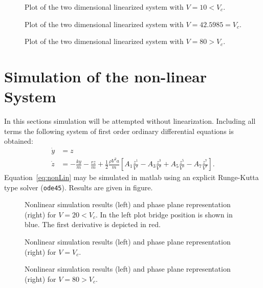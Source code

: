 \begin{figure}
\centering

\caption{Plot of the two dimensional linearized system with $V = 10 < V_c$.}

\caption{Plot of the two dimensional linearized system with $V = 42.5985 = V_c$.}

\caption{Plot of the two dimensional linearized system with $V = 80 > V_c$.}
\end{figure}




\section{Simulation of the non-linear System}
In this sections simulation will be attempted without linearization. Including all terms the following system of first order ordinary differential equations is obtained:
\begin{align}
\dot{y} &= z \\
\dot{z} &= -\frac{ky}{m} - \frac{rz}{m} + \frac{1}{2} \frac{\rho V^2 a}{m} [ A_1\frac{z^1}{V^1} - A_3 \frac{z^3}{V^3} + A_5 \frac{z^5}{V^5} - A_7 \frac{z^7}{V^7} ].
\label{eq:nonLin}
\end{align} 
Equation~\ref{eq:nonLin} may be simulated in matlab using an explicit Runge-Kutta type solver (\texttt{ode45}). Results are given in figure.
\begin{figure}


\caption{Nonlinear simulation results (left) and phase plane representation (right) for $V = 20 < V_c$. In the left plot bridge position is shown in blue. The first derivative is depicted in red.}
\end{figure}
\begin{figure}


\caption{Nonlinear simulation results (left) and phase plane representation (right) for $V = V_c$.}
\end{figure}
\begin{figure}


\caption{Nonlinear simulation results (left) and phase plane representation (right) for $V = 80 > V_c$.}
\end{figure}







